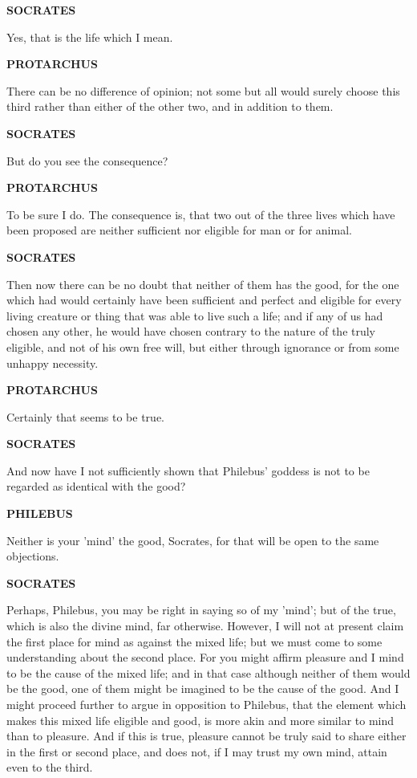 \documentclass[11pt,letter]{article}
\begin{document}
\par \textbf{SOCRATES}
\par   Yes, that is the life which I mean.

\par \textbf{PROTARCHUS}
\par   There can be no difference of opinion; not some but all would surely choose this third rather than either of the other two, and in addition to them.

\par \textbf{SOCRATES}
\par   But do you see the consequence?

\par \textbf{PROTARCHUS}
\par   To be sure I do. The consequence is, that two out of the three lives which have been proposed are neither sufficient nor eligible for man or for animal.

\par \textbf{SOCRATES}
\par   Then now there can be no doubt that neither of them has the good, for the one which had would certainly have been sufficient and perfect and eligible for every living creature or thing that was able to live such a life; and if any of us had chosen any other, he would have chosen contrary to the nature of the truly eligible, and not of his own free will, but either through ignorance or from some unhappy necessity.

\par \textbf{PROTARCHUS}
\par   Certainly that seems to be true.

\par \textbf{SOCRATES}
\par   And now have I not sufficiently shown that Philebus' goddess is not to be regarded as identical with the good?

\par \textbf{PHILEBUS}
\par   Neither is your 'mind' the good, Socrates, for that will be open to the same objections.

\par \textbf{SOCRATES}
\par   Perhaps, Philebus, you may be right in saying so of my 'mind'; but of the true, which is also the divine mind, far otherwise. However, I will not at present claim the first place for mind as against the mixed life; but we must come to some understanding about the second place. For you might affirm pleasure and I mind to be the cause of the mixed life; and in that case although neither of them would be the good, one of them might be imagined to be the cause of the good. And I might proceed further to argue in opposition to Philebus, that the element which makes this mixed life eligible and good, is more akin and more similar to mind than to pleasure. And if this is true, pleasure cannot be truly said to share either in the first or second place, and does not, if I may trust my own mind, attain even to the third.
\end{document}
